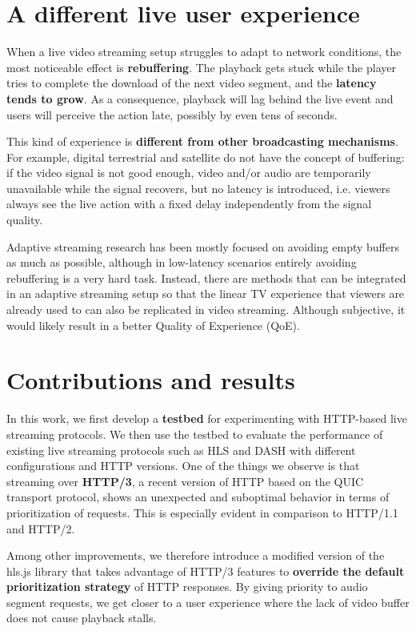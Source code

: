 \section{A different live user experience}
\label{sec:intro/experience}

When a live video streaming setup struggles to adapt to network conditions, the most noticeable effect is \textbf{rebuffering}. The playback gets stuck while the player tries to complete the download of the next video segment, and the \textbf{latency tends to grow}. As a consequence, playback will lag behind the live event and users will perceive the action late, possibly by even tens of seconds.

This kind of experience is \textbf{different from other broadcasting mechanisms}. For example, digital terrestrial and satellite do not have the concept of buffering: if the video signal is not good enough, video and/or audio are temporarily unavailable while the signal recovers, but no latency is introduced, i.e. viewers always see the live action with a fixed delay independently from the signal quality.

Adaptive streaming research has been mostly focused on avoiding empty buffers as much as possible, although in low-latency scenarios entirely avoiding rebuffering is a very hard task. Instead, there are methods that can be integrated in an adaptive streaming setup so that the linear TV experience that viewers are already used to can also be replicated in video streaming. Although subjective, it would likely result in a better Quality of Experience (QoE).

\section{Contributions and results}
\label{sec:intro/contributions}

In this work, we first develop a \textbf{testbed} for experimenting with HTTP-based live streaming protocols. We then use the testbed to evaluate the performance of existing live streaming protocols such as HLS and DASH with different configurations and HTTP versions. One of the things we observe is that streaming over \textbf{HTTP/3}, a recent version of HTTP based on the QUIC transport protocol, shows an unexpected and suboptimal behavior in terms of prioritization of requests. This is especially evident in comparison to HTTP/1.1 and HTTP/2.

Among other improvements, we therefore introduce a modified version of the hls.js library that takes advantage of HTTP/3 features to \textbf{override the default prioritization strategy} of HTTP responses. By giving priority to audio segment requests, we get closer to a user experience where the lack of video buffer does not cause playback stalls.

